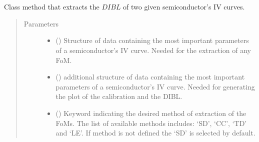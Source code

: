 \documentclass[letterpaper,10pt,english,openany, oneside]{sphinxmanual}
\begin{document}
\begin{fulllineitems}
\label{\detokenize{index:fompy.fom.dibl_ext}}~

\begin{fulllineitems}
\label{\detokenize{index:fompy.fom.dibl_ext.extraction}}~

\begin{fulllineitems}
Class method that extracts the \(DIBL\) of two given semiconductor’s IV curves.

\end{fulllineitems}

\begin{quote}\begin{description}
\item[{Parameters}] \leavevmode\begin{itemize}
\item {} 
 () \textendash{} Structure of data containing the most important parameters of a semiconductor’s IV curve.
Needed for the extraction of any FoM.

\item {} 
 () \textendash{} additional structure of data containing the most important parameters of a semiconductor’s IV curve.
Needed for generating the plot of the calibration and the DIBL.

\item {} 
 () \textendash{} Keyword indicating the desired method of extraction of the FoMs. The list of available methods includes:
‘SD’, ‘CC’, ‘TD’ and ‘LE’. If method is not defined the ‘SD’ is selected by default.

\end{itemize}

\end{description}\end{quote}


\end{fulllineitems}
\end{fulllineitems}
\end{document}
